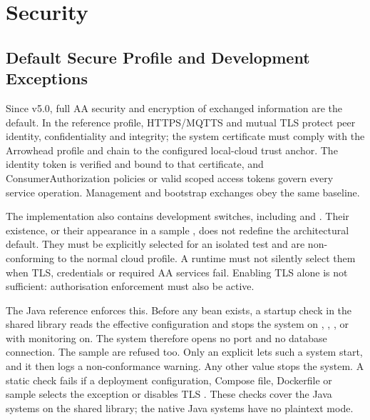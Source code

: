 \documentclass[a4paper]{arrowhead}
\begin{document}
\section{Security}
\label{sec:security}

\subsection{Default Secure Profile and Development Exceptions}
\label{sec:secure-default}
Since v5.0, full AA security and encryption of exchanged information are the default.
In the reference profile, HTTPS/MQTTS and mutual TLS protect peer identity,
confidentiality and integrity; the system certificate must comply with the Arrowhead
profile and chain to the configured local-cloud trust anchor. The
 identity token is verified and bound to that certificate, and
ConsumerAuthorization policies or valid scoped access tokens govern every service
operation. Management and bootstrap exchanges obey the same baseline.

The implementation also contains development switches, including
 and .
Their existence, or their appearance in a sample ,
does not redefine the architectural default. They must be explicitly selected for
an isolated test and are non-conforming to the normal cloud profile. A runtime
must not silently select them when TLS, credentials or required AA services fail.
Enabling TLS alone is not sufficient: authorisation enforcement must also be active.

The Java reference enforces this. Before any bean exists, a startup check in the
shared library reads the effective configuration and stops the system on
, ,
, or 
with monitoring on. The system therefore opens no port and no database connection. The
sample  are refused too. Only an explicit
 lets such a system start, and it then
logs a non-conformance warning. Any other value stops the system. A static check
fails if a deployment configuration, Compose file, Dockerfile or sample selects the
exception or disables TLS \cite{javaConformance20261107}. These checks cover the Java
systems on the shared library; the native Java systems have no plaintext mode.
\end{document}
